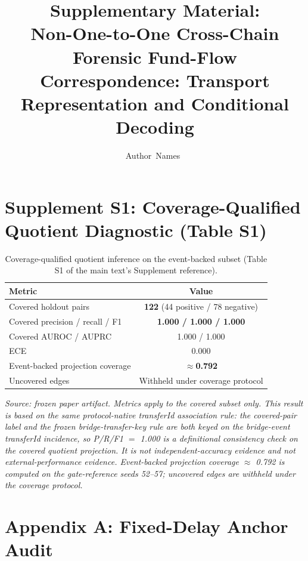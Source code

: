 \documentclass[journal]{IEEEtran}
\begin{document}
\title{Supplementary Material:\\ Non-One-to-One Cross-Chain Forensic Fund-Flow Correspondence: Transport Representation and Conditional Decoding}

\author{Author~Names~}

\maketitle

\section*{Supplement S1: Coverage-Qualified Quotient Diagnostic (Table S1)}

\begin{table}[!t]
\caption{Coverage-qualified quotient inference on the event-backed subset (Table S1 of the main text's Supplement reference).}
\label{tab:S1}
\centering
\begin{tabular}{L{0.62\columnwidth}c}
\toprule
Metric & Value \\
\midrule
Covered holdout pairs & \textbf{122} (44 positive / 78 negative) \\
Covered precision / recall / F1 & \textbf{1.000 / 1.000 / 1.000} \\
Covered AUROC / AUPRC & 1.000 / 1.000 \\
ECE & 0.000 \\
Event-backed projection coverage & \textbf{$\approx$0.792} \\
Uncovered edges & Withheld under coverage protocol \\
\bottomrule
\end{tabular}
\end{table}

\emph{Source: frozen paper artifact. Metrics apply to the covered subset only. This result is based on the same protocol-native transferId association rule: the covered-pair label and the frozen bridge-transfer-key rule are both keyed on the bridge-event transferId incidence, so P/R/F1 $=$ 1.000 is a definitional consistency check on the covered quotient projection. It is not independent-accuracy evidence and not external-performance evidence. Event-backed projection coverage $\approx$ 0.792 is computed on the gate-reference seeds 52--57; uncovered edges are withheld under the coverage protocol.}

\section*{Appendix A: Fixed-Delay Anchor Audit}
\end{document}
